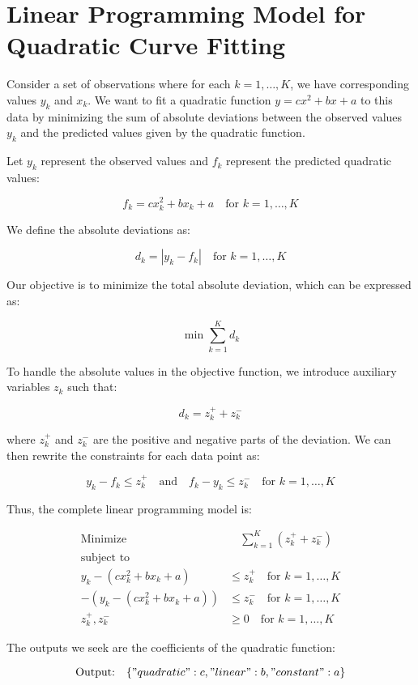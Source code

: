 \documentclass{article}
\begin{document}
\section*{Linear Programming Model for Quadratic Curve Fitting}

Consider a set of observations where for each \( k = 1, \ldots, K \), we have corresponding values \( y_k \) and \( x_k \). We want to fit a quadratic function \( y = c x^2 + b x + a \) to this data by minimizing the sum of absolute deviations between the observed values \( y_k \) and the predicted values given by the quadratic function.

Let \( y_k \) represent the observed values and \( f_k \) represent the predicted quadratic values:

\[
f_k = c x_k^2 + b x_k + a \quad \text{for } k = 1, \ldots, K
\]

We define the absolute deviations as:

\[
d_k = |y_k - f_k| \quad \text{for } k = 1, \ldots, K
\]

Our objective is to minimize the total absolute deviation, which can be expressed as:

\[
\min \sum_{k=1}^{K} d_k
\]

To handle the absolute values in the objective function, we introduce auxiliary variables \( z_k \) such that:

\[
d_k = z_k^+ + z_k^-
\]

where \( z_k^+ \) and \( z_k^- \) are the positive and negative parts of the deviation. We can then rewrite the constraints for each data point as:

\[
y_k - f_k \leq z_k^+ \quad \text{and} \quad f_k - y_k \leq z_k^- \quad \text{for } k = 1, \ldots, K
\]

Thus, the complete linear programming model is:

\begin{align*}
\text{Minimize} & \quad \sum_{k=1}^{K} (z_k^+ + z_k^-) \\
\text{subject to} & \\
y_k - (c x_k^2 + b x_k + a) & \leq z_k^+ \quad \text{for } k = 1, \ldots, K \\
-(y_k - (c x_k^2 + b x_k + a)) & \leq z_k^- \quad \text{for } k = 1, \ldots, K \\
z_k^+, z_k^- & \geq 0 \quad \text{for } k = 1, \ldots, K
\end{align*}

The outputs we seek are the coefficients of the quadratic function:

\[
\text{Output:} \quad \{ "quadratic": c, "linear": b, "constant": a \}
\]
\end{document}
